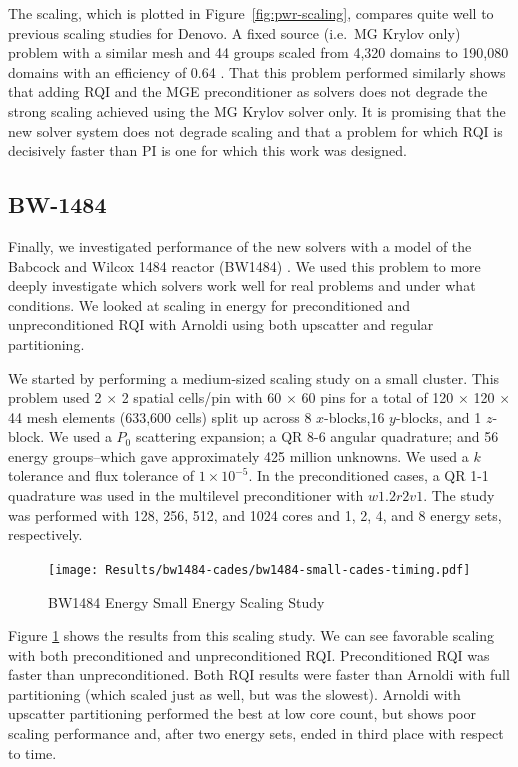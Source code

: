 \documentclass{article}                                                                           %
\begin{document}
The scaling, which is plotted in Figure~\ref{fig:pwr-scaling}, compares quite well to previous scaling studies for Denovo. A fixed source (i.e.\ MG Krylov only) problem with a similar mesh and 44 groups scaled from 4,320 domains to 190,080 domains with an efficiency of 0.64 \cite{Slaybaugh2011}. That this problem performed similarly shows that adding RQI and the MGE preconditioner as solvers does not degrade the strong scaling achieved using the MG Krylov solver only. It is promising that the new solver system does not degrade scaling and that a problem for which RQI is decisively faster than PI is one for which this work was designed. 


\subsection{BW-1484}
Finally, we investigated performance of the new solvers with a model of the Babcock and Wilcox 1484 reactor (BW1484) \cite{bw1484}. We used this problem to more deeply investigate which solvers work well for real problems and under what conditions. We looked at scaling in energy for preconditioned and unpreconditioned RQI with Arnoldi using both upscatter and regular partitioning. 


We started by performing a medium-sized scaling study on a small cluster. This problem used 2 $\times$ 2 spatial cells/pin with 60 $\times$ 60 pins for a total of 120 $\times$ 120 $\times$ 44 mesh elements (633,600 cells) split up across 8 $x$-blocks,16 $y$-blocks, and 1 $z$-block. 
We used a $P_0$ scattering expansion; a QR 8-6 angular quadrature; and 56 energy groups--which gave approximately 425 million unknowns. 
We used a $k$ tolerance and flux tolerance of $1 \times 10^{-5}$.
In the preconditioned cases, a QR 1-1 quadrature was used in the multilevel preconditioner with $w1.2r2v1$. 
The study was performed with 128, 256, 512, and 1024 cores and 1, 2, 4, and 8 energy sets, respectively. 

\begin{figure}
\caption{BW1484 Energy Small Energy Scaling Study}
\texttt{[image: Results/bw1484-cades/bw1484-small-cades-timing.pdf]}
\label{fig:small}
\centering
\end{figure}
%
Figure \ref{fig:small} shows the results from this scaling study. We can see favorable scaling with both preconditioned and unpreconditioned RQI. Preconditioned RQI was faster than unpreconditioned. Both RQI results were faster than Arnoldi with full partitioning (which scaled just as well, but was the slowest). Arnoldi with upscatter partitioning performed the best at low core count, but shows poor scaling performance and, after two energy sets, ended in third place with respect to time. 
\end{document}

